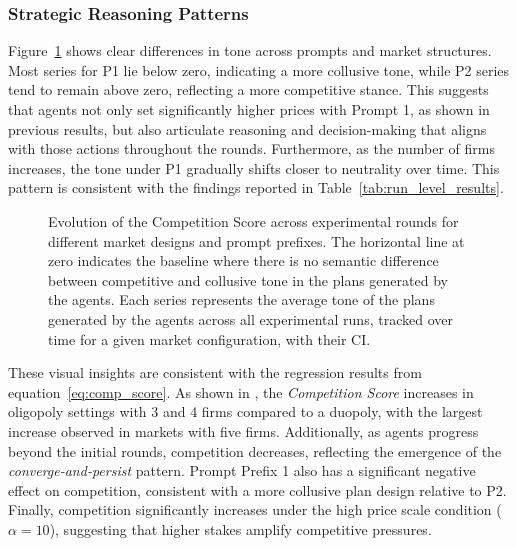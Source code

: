 \subsubsection*{Strategic Reasoning Patterns}
Figure~\ref{fig:plans_competition_score} shows clear differences in tone across prompts and market structures. Most series for P1 lie below zero, indicating a more collusive tone, while P2 series tend to remain above zero, reflecting a more competitive stance. This suggests that agents not only set significantly higher prices with Prompt 1, as shown in previous results, but also articulate reasoning and decision-making that aligns with those actions throughout the rounds. Furthermore, as the number of firms increases, the tone under P1 gradually shifts closer to neutrality over time. This pattern is consistent with the findings reported in Table~\ref{tab:run_level_results}.

\begin{figure}[htpb!]
    \centering
    
    \caption{Evolution of the Competition Score across experimental rounds for different market designs and prompt prefixes. The horizontal line at zero indicates the baseline where there is no semantic difference between competitive and collusive tone in the plans generated by the agents. Each series represents the average tone of the plans generated by the agents across all experimental runs, tracked over time for a given market configuration, with their CI.} \label{fig:plans_competition_score}
\end{figure}

These visual insights are consistent with the regression results from equation~\eqref{eq:comp_score}. As shown in , the \textit{Competition Score} increases in oligopoly settings with 3 and 4 firms compared to a duopoly, with the largest increase observed in markets with five firms. Additionally, as agents progress beyond the initial rounds, competition decreases, reflecting the emergence of the \textit{converge-and-persist} pattern. Prompt Prefix 1 also has a significant negative effect on competition, consistent with a more collusive plan design relative to P2. Finally, competition significantly increases under the high price scale condition ($\alpha = 10$), suggesting that higher stakes amplify competitive pressures.

